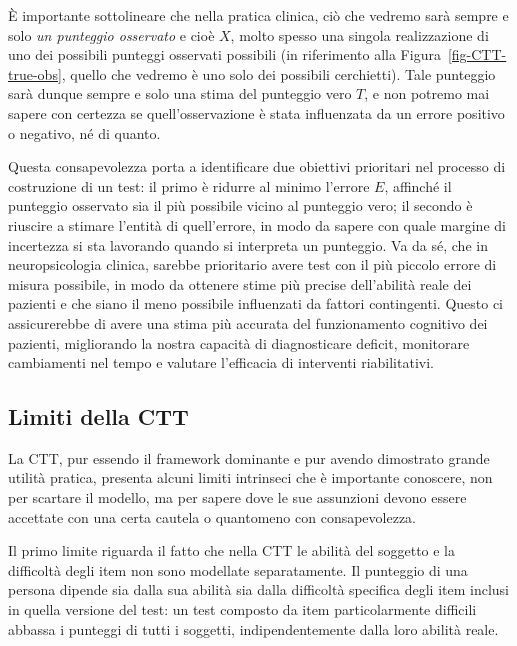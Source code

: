 \documentclass[
  italian,
  letterpaper,
  paper=6in:9in,
  pagesize=pdftex,
  headinclude=on,
  footinclude=on,
  11pt]{scrbook}
\begin{document}
È importante sottolineare che nella pratica clinica, ciò che vedremo
sarà sempre e solo \emph{un punteggio osservato} e cioè \(X\), molto
spesso una singola realizzazione di uno dei possibili punteggi osservati
possibili (in riferimento alla Figura~\ref{fig-CTT-true-obs}, quello che
vedremo è uno solo dei possibili cerchietti). Tale punteggio sarà dunque
sempre e solo una stima del punteggio vero \(T\), e non potremo mai
sapere con certezza se quell'osservazione è stata influenzata da un
errore positivo o negativo, né di quanto.

Questa consapevolezza porta a identificare due obiettivi prioritari nel
processo di costruzione di un test: il primo è ridurre al minimo
l'errore \(E\), affinché il punteggio osservato sia il più possibile
vicino al punteggio vero; il secondo è riuscire a stimare l'entità di
quell'errore, in modo da sapere con quale margine di incertezza si sta
lavorando quando si interpreta un punteggio. Va da sé, che in
neuropsicologia clinica, sarebbe prioritario avere test con il più
piccolo errore di misura possibile, in modo da ottenere stime più
precise dell'abilità reale dei pazienti e che siano il meno possibile
influenzati da fattori contingenti. Questo ci assicurerebbe di avere una
stima più accurata del funzionamento cognitivo dei pazienti, migliorando
la nostra capacità di diagnosticare deficit, monitorare cambiamenti nel
tempo e valutare l'efficacia di interventi riabilitativi.

\subsection{Limiti della CTT}\label{limiti-della-ctt}

La CTT, pur essendo il framework dominante e pur avendo dimostrato
grande utilità pratica, presenta alcuni limiti intrinseci che è
importante conoscere, non per scartare il modello, ma per sapere dove le
sue assunzioni devono essere accettate con una certa cautela o
quantomeno con consapevolezza.

Il primo limite riguarda il fatto che nella CTT le abilità del soggetto
e la difficoltà degli item non sono modellate separatamente. Il
punteggio di una persona dipende sia dalla sua abilità sia dalla
difficoltà specifica degli item inclusi in quella versione del test: un
test composto da item particolarmente difficili abbassa i punteggi di
tutti i soggetti, indipendentemente dalla loro abilità reale.
\end{document}

